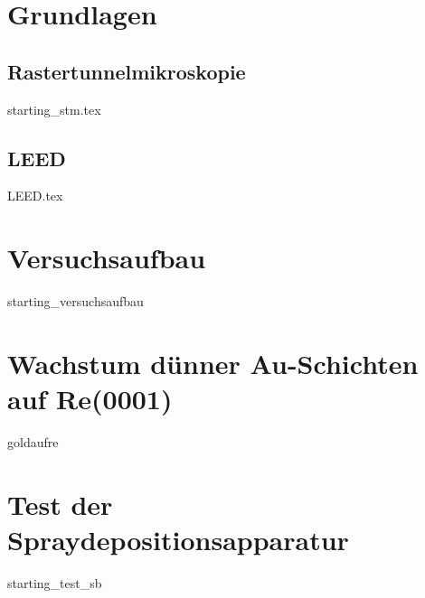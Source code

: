 \documentclass[pdftex,a4paper,german,openbib,final,11pt,twoside,chapterprefix,
headsepline]{scrbook}
\begin{document}
\mainmatter  
\sloppy






\chapter{Grundlagen}


\section{Rastertunnelmikroskopie}
{starting_stm.tex}
 \section{LEED}
 {LEED.tex}


 \chapter{Versuchsaufbau} 
 {starting_versuchsaufbau}
 
\chapter{Wachstum dünner Au-Schichten auf Re(0001)}
{goldaufre}
 
\chapter{Test der Spraydepositionsapparatur} \label{kaptest}
{starting_test_sb}



% 
% 
\end{document}
